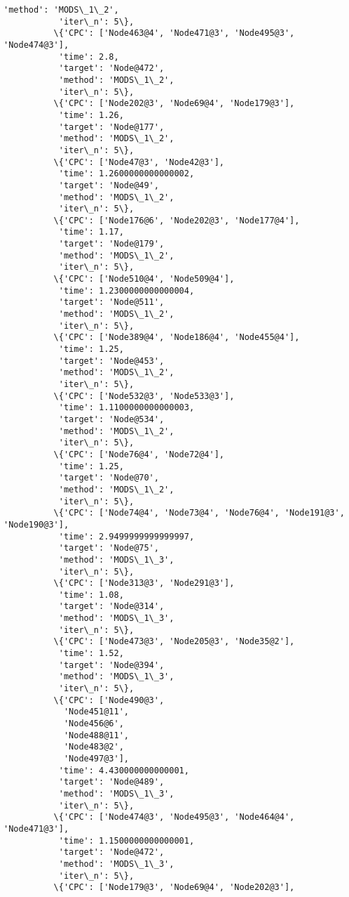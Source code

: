 \documentclass[11pt]{article}
\begin{document}
\begin{Verbatim}[commandchars=\\\{\}]
           'method': 'MODS\_1\_2',
           'iter\_n': 5\},
          \{'CPC': ['Node463@4', 'Node471@3', 'Node495@3', 'Node474@3'],
           'time': 2.8,
           'target': 'Node@472',
           'method': 'MODS\_1\_2',
           'iter\_n': 5\},
          \{'CPC': ['Node202@3', 'Node69@4', 'Node179@3'],
           'time': 1.26,
           'target': 'Node@177',
           'method': 'MODS\_1\_2',
           'iter\_n': 5\},
          \{'CPC': ['Node47@3', 'Node42@3'],
           'time': 1.2600000000000002,
           'target': 'Node@49',
           'method': 'MODS\_1\_2',
           'iter\_n': 5\},
          \{'CPC': ['Node176@6', 'Node202@3', 'Node177@4'],
           'time': 1.17,
           'target': 'Node@179',
           'method': 'MODS\_1\_2',
           'iter\_n': 5\},
          \{'CPC': ['Node510@4', 'Node509@4'],
           'time': 1.2300000000000004,
           'target': 'Node@511',
           'method': 'MODS\_1\_2',
           'iter\_n': 5\},
          \{'CPC': ['Node389@4', 'Node186@4', 'Node455@4'],
           'time': 1.25,
           'target': 'Node@453',
           'method': 'MODS\_1\_2',
           'iter\_n': 5\},
          \{'CPC': ['Node532@3', 'Node533@3'],
           'time': 1.1100000000000003,
           'target': 'Node@534',
           'method': 'MODS\_1\_2',
           'iter\_n': 5\},
          \{'CPC': ['Node76@4', 'Node72@4'],
           'time': 1.25,
           'target': 'Node@70',
           'method': 'MODS\_1\_2',
           'iter\_n': 5\},
          \{'CPC': ['Node74@4', 'Node73@4', 'Node76@4', 'Node191@3', 'Node190@3'],
           'time': 2.9499999999999997,
           'target': 'Node@75',
           'method': 'MODS\_1\_3',
           'iter\_n': 5\},
          \{'CPC': ['Node313@3', 'Node291@3'],
           'time': 1.08,
           'target': 'Node@314',
           'method': 'MODS\_1\_3',
           'iter\_n': 5\},
          \{'CPC': ['Node473@3', 'Node205@3', 'Node35@2'],
           'time': 1.52,
           'target': 'Node@394',
           'method': 'MODS\_1\_3',
           'iter\_n': 5\},
          \{'CPC': ['Node490@3',
            'Node451@11',
            'Node456@6',
            'Node488@11',
            'Node483@2',
            'Node497@3'],
           'time': 4.430000000000001,
           'target': 'Node@489',
           'method': 'MODS\_1\_3',
           'iter\_n': 5\},
          \{'CPC': ['Node474@3', 'Node495@3', 'Node464@4', 'Node471@3'],
           'time': 1.1500000000000001,
           'target': 'Node@472',
           'method': 'MODS\_1\_3',
           'iter\_n': 5\},
          \{'CPC': ['Node179@3', 'Node69@4', 'Node202@3'],

\end{Verbatim}
\end{document}
